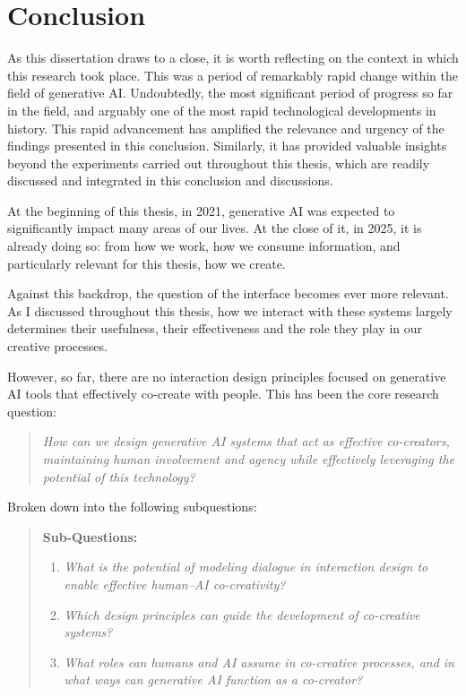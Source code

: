 \chapter[Conclusion]{Conclusion}\label{c:conclusion}

As this dissertation draws to a close, it is worth reflecting on the context in which this research took place. This was a period of remarkably rapid change within the field of generative AI. Undoubtedly, the most significant period of progress so far in the field, and arguably one of the most rapid technological developments in history. This rapid advancement has amplified the relevance and urgency of the findings presented in this conclusion. Similarly, it has provided valuable insights beyond the experiments carried out throughout this thesis, which are readily discussed and integrated in this conclusion and discussions. 

At the beginning of this thesis, in 2021, generative AI was expected to significantly impact many areas of our lives. At the close of it, in 2025, it is already doing so: from how we work, how we consume information, and particularly relevant for this thesis, how we create.

Against this backdrop, the question of the interface becomes ever more relevant. As I discussed throughout this thesis, how we interact with these systems largely determines their usefulness, their effectiveness and the role they play in our creative processes. 

However, so far, there are no interaction design principles focused on generative AI tools that effectively co-create with people. This has been the core research question: 

\begin{quote}
\emph{How can we design generative AI systems that act as effective co-creators, maintaining human involvement and agency while effectively leveraging the potential of this technology?}
\end{quote}

Broken down into the following subquestions: 

\begin{quote}
\textbf{Sub-Questions:}
\begin{enumerate}
    \item \emph{What is the potential of modeling dialogue in interaction design to enable effective human--AI co-creativity?}
    \item \emph{Which design principles can guide the development of co-creative systems?}
    \item \emph{What roles can humans and AI assume in co-creative processes, and in what ways can generative AI function as a co-creator?}
\end{enumerate}
\end{quote}

